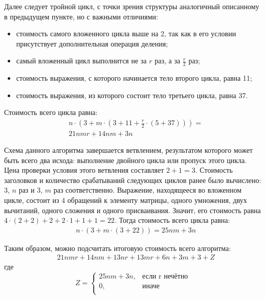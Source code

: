 Далее следует тройной цикл, с точки зрения структуры аналогичный описанному в предыдущем пункте, но с важными отличиями:
\begin{itemize}
    \item стоимость самого вложенного цикла выше на 2, так как в его условии присутствует дополнительная операция деления;
    \item самый вложенный цикл выполнится не за $r$ раз, а за $\frac{r}{2}$ раз;
    \item стоимость выражения, с которого начинается тело второго цикла, равна 11;
    \item стоимость выражения, из которого состоит тело третьего цикла, равна 37.
\end{itemize}
Стоимость всего цикла равна:
\begin{equation}
    \begin{split}
        & n\cdot{}(3 + m\cdot(3 + 11 + \frac{r}{2}\cdot{}(5 + 37))) = \\
        & 21nmr + 14nm + 3n
    \end{split}
\end{equation}

Схема данного алгоритма завершается ветвлением, результатом которого может быть всего два исхода: выполнение двойного цикла или пропуск этого цикла. Цена проверки условия этого ветвления составляет $2 + 1 = 3$. Стоимость заголовков и количество срабатываний следующих циклов ранее было вычислено: 3, $n$ раз и 3, $m$ раз соответственно. Выражение, находящееся во вложенном цикле, состоит из 4 обращений к элементу матрицы, одного умножения, двух вычитаний, одного сложения и одного присваивания. Значит, его стоимость равна $4\cdot{}(2 + 2) + 2 + 2\cdot{}1 + 1 + 1 = 22$. Тогда стоимость всего цикла равна:
\begin{equation}
    \begin{split}
        & n\cdot{}(3 + m\cdot{}(3 + 22)) = 25nm + 3n
    \end{split}
\end{equation}

Таким образом, можно подсчитать итоговую стоимость всего алгоритма:
\begin{equation}
    \begin{split}
        & 21nmr + 14nm + 13nr + 13mr + 6n + 3m + 3 + Z
    \end{split}
\end{equation}
где
\begin{equation}
Z = \left\{ \begin{array}{ll}
 25nm + 3n, & \textrm{если r нечётно}\\
 0, & \textrm{иначе}\\
\end{array} \right.
\end{equation}

